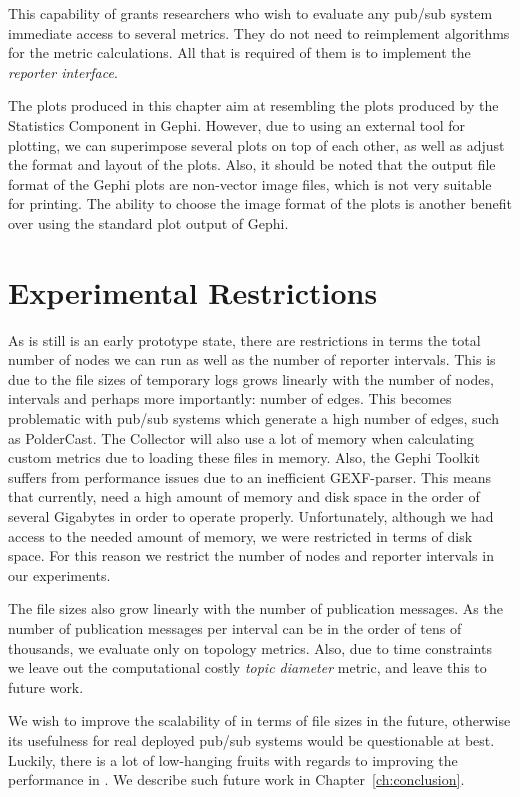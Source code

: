 This capability of \demo{} grants researchers who wish to evaluate
any pub/sub system immediate access to several metrics. They do not need to
reimplement algorithms for the metric calculations. All that is
required of them is to implement the \emph{reporter interface}.

The plots produced in this chapter aim at resembling the plots produced by the
Statistics Component in Gephi. However, due to using an external tool
for plotting, we can superimpose several plots on top of each other, as
well as adjust the format and layout of the plots. Also, it should be
noted that the output file format of the Gephi plots are non-vector
image files, which is not very suitable for printing. The ability to choose the
image format of the plots is another benefit over using the
standard plot output of Gephi.

\section{Experimental Restrictions}

As \demo{} is still is an early prototype state, there are restrictions
in terms the total number of nodes we can run as well as the number of
reporter intervals. This is due to the file sizes of temporary logs
grows linearly with the number of nodes, intervals and perhaps more
importantly: number of edges. This becomes problematic with pub/sub
systems which generate a high number of edges, such as PolderCast. The
Collector will also use a lot of memory when calculating custom metrics
due to loading these files in memory. Also, the Gephi Toolkit suffers
from performance issues due to an inefficient GEXF-parser. This means
that currently, \demo{} need a high amount of memory and disk space in
the order of several Gigabytes in order to operate properly.
Unfortunately, although we had access to the needed amount of memory, we
were restricted in terms of disk space. For this reason we restrict the
number of nodes and reporter intervals in our experiments.

The file sizes also grow linearly with the number of publication
messages. As the number of publication messages per interval can be in
the order of tens of thousands,  we evaluate only on topology metrics.
Also, due to time constraints we leave out the computational costly
\emph{topic diameter} metric, and leave this to future work.

We wish to improve the scalability of \demo{} in terms of file sizes in
the future, otherwise its usefulness for real deployed pub/sub systems
would be questionable at best. Luckily, there is a lot of low-hanging
fruits with regards to improving the performance in \demo{}. We describe
such future work in Chapter~\ref{ch:conclusion}.

